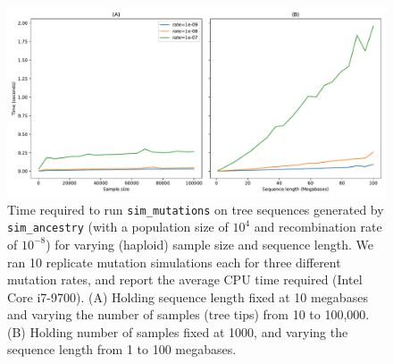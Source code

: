 \documentclass{article}
\begin{document}
\begin{figure}
    \includegraphics[width=\textwidth]{figures/mutations-perf}
\caption{\label{fig-mutations-perf} Time required to run
\texttt{sim\_mutations} on tree sequences generated
by \texttt{sim\_ancestry} (with a population size of $10^4$
and recombination rate of $10^{-8}$) for varying (haploid) sample
size and sequence length. We ran 10 replicate mutation simulations
each for three different mutation rates, and report the average
CPU time required (Intel Core i7-9700).
(A) Holding sequence length fixed at 10 megabases and varying the
number of samples (tree tips) from 10 to 100,000.
(B) Holding number of samples fixed at 1000, and varying the sequence
length from 1 to 100 megabases.}
\end{figure}
\end{document}
